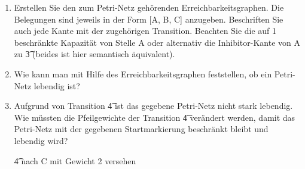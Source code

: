 \documentclass{bschlangaul-aufgabe}
\begin{document}
\begin{enumerate}


\item Erstellen Sie den zum Petri-Netz gehörenden
Erreichbarkeitsgraphen. Die Belegungen sind
jeweils in der Form [A, B, C] anzugeben. Beschriften Sie auch jede Kante
mit der zugehörigen Transition. Beachten Sie die auf 1 beschränkte
Kapazität von Stelle A oder alternativ die Inhibitor-Kante von A zu
\t3 (beides ist hier semantisch äquivalent).



\item Wie kann man mit Hilfe des Erreichbarkeitsgraphen feststellen, ob
ein Petri-Netz lebendig ist?


\item Aufgrund von Transition \t4 ist das gegebene Petri-Netz nicht
stark lebendig. Wie müssten die Pfeilgewichte der Transition \t4
verändert werden, damit das Petri-Netz mit der gegebenen Startmarkierung
beschränkt bleibt und lebendig wird?

\begin{bAntwort}
\t4 nach C mit Gewicht 2 versehen
\end{bAntwort}

\end{enumerate}
\end{document}
